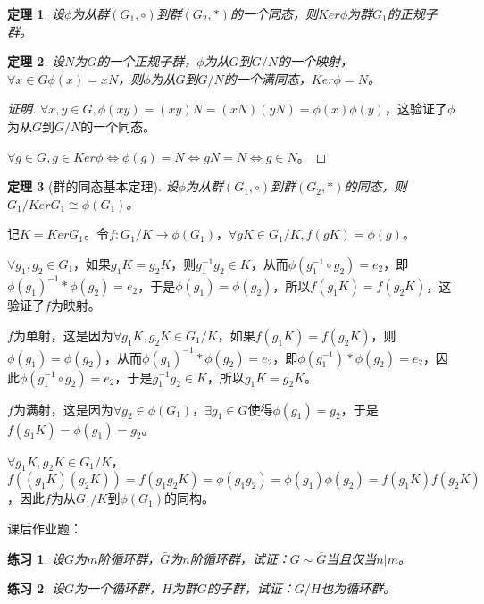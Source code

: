 \documentclass{article}
\newtheorem{Thm}{定理}
\newtheorem{Exercise}{练习}
\begin{document}
\begin{CJK*}{UTF8}{gbsn}
\begin{Thm}
  设$\phi$为从群$(G_1,\circ)$到群$(G_2,*)$的一个同态，则$Ker \phi$为群$G_1$的正规子群。
\end{Thm}

\begin{Thm}
设$N$为$G$的一个正规子群，$\phi$为从$G$到$G/N$的一个映射，$\forall x\in G \phi(x)=xN$，则$\phi$为从$G$到$G/N$的一个满同态，$Ker \phi=N$。
\end{Thm}
\begin{proof}[证明]
  $\forall x,y\in G, \phi(xy)=(xy)N=(xN)(yN)=\phi(x)\phi(y)$，这验证了$\phi$为从$G$到$G/N$的一个同态。

  $\forall g\in G, g\in Ker\phi \Leftrightarrow \phi(g)=N \Leftrightarrow gN=N \Leftrightarrow g\in N$。
\end{proof}
\begin{Thm}[群的同态基本定理]
设$\phi$为从群$(G_1,\circ)$到群$(G_2,*)$的同态，则$G_1/Ker G_1 \cong \phi(G_1)$。
\end{Thm}
记$K=KerG_1$。令$f:G_1/K\to \phi(G_1)$，$\forall gK\in G_1/K, f(gK)=\phi(g)$。

$\forall g_1,g_2\in G_1$，如果$g_1K=g_2K$，则$g_1^{-1}g_2\in K$，从而$\phi(g_1^{-1}\circ g_2)=e_2$，即$\phi(g_1)^{-1}*\phi(g_2)=e_2$，于是$\phi(g_1)=\phi(g_2)$，所以$f(g_1K)=f(g_2K)$，这验证了$f$为映射。

$f$为单射，这是因为$\forall g_1K,g_2K\in G_1/K$，如果$f(g_1K)=f(g_2K)$，则$\phi(g_1)=\phi(g_2)$，从而$\phi(g_1)^{-1}*\phi(g_2)=e_2$，即$\phi(g_1^{-1})*\phi(g_2)=e_2$，因此$\phi(g_1^{-1}\circ g_2)=e_2$，于是$g_1^{-1}g_2\in K$，所以$g_1K=g_2K$。

$f$为满射，这是因为$\forall g_2 \in \phi(G_1)$，$\exists g_1\in G$使得$\phi(g_1)=g_2$，于是$f(g_1K)=\phi(g_1)=g_2$。

$\forall g_1K,g_2K\in G_1/K$，$f((g_1K)(g_2K))=f(g_1g_2K)=\phi(g_1g_2)=\phi(g_1)\phi(g_2)=f(g_1K)f(g_2K)$，因此$f$为从$G_1/K$到$\phi(G_1)$的同构。

课后作业题：
\begin{Exercise}
设$G$为$m$阶循环群，$\bar{G}$为$n$阶循环群，试证：$G \sim \bar{G}$当且仅当$n | m$。
\end{Exercise}

\begin{Exercise}
设$G$为一个循环群，$H$为群$G$的子群，试证：$G/H$也为循环群。
\end{Exercise}
\end{CJK*}
\end{document}
